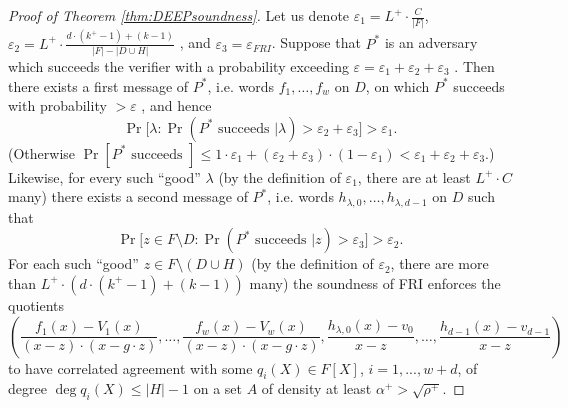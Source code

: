 \documentclass[11pt,article,oneside]{memoir}
\theoremstyle{definition}
\theoremstyle{remark}
\begin{document}
\begin{proof}[Proof of Theorem \ref{thm:DEEPsoundness}]
Let us denote $\varepsilon_1=L^+ \cdot \frac{C}{|F|}$, $\varepsilon_2 = L^+ \cdot  \frac{d\cdot (k^+ - 1) + (k - 1)}{|F| - |D\cup H|}$ , and $\varepsilon_3=\varepsilon_{FRI}$. 
Suppose that $P^*$ is an adversary which succeeds the verifier with a probability exceeding $\varepsilon =\varepsilon_1+\varepsilon_2+\varepsilon_3$ .
Then there exists a first message of $P^*$, i.e. words  $f_1, \ldots, f_w$  on $D$, on which $P^*$ succeeds with probability $> \varepsilon$ , and hence
\[
\Pr\big[\lambda : \Pr\left(P^*\text{ succeeds } |\lambda\right) > \varepsilon_2+\varepsilon_3 \big] > \varepsilon_1.
\]
(Otherwise $\Pr[P^*\text{ succeeds }] \leq 1\cdot \varepsilon_1+ (\varepsilon_2 + \varepsilon_3)\cdot (1-\varepsilon_1) < \varepsilon_1+ \varepsilon_2 + \varepsilon_3$.) 
Likewise, for every such “good” $\lambda$ (by the definition of $\varepsilon_1$, there are at least $L^+\cdot C$ many) there exists a second message of $P^*$, i.e. words $h_{\lambda, 0}, \ldots, h_{\lambda, d-1}$ on $D$ such that 
\[
\Pr\big[ z\in F\setminus D :  \Pr(P^*\text{ succeeds }| z) >\varepsilon_3 \big] > \varepsilon_2.
\]
For each such “good” $z\in F\setminus (D\cup H)$ (by the definition of $\varepsilon_2$, there are more than $L^+\cdot \left(d\cdot (k^+ - 1) + (k - 1)\right)$ many) the soundness of FRI enforces the quotients
\[ 
\left( 
\frac{f_1(x)-V_1(x)}{(x-z)\cdot (x-g\cdot z)}, \ldots, \frac{f_w(x)-V_w(x)}{(x-z)\cdot (x-g\cdot z)}, \frac{h_{\lambda,0}(x)- v_0}{x-z}, \ldots , \frac{h_{d - 1}(x) -v_{d-1}}{x-z}
\right)
\]
to have correlated agreement with some $q_i(X)\in F[X]$, $i=1,...,w +d$, of degree $\deg q_i(X) \leq |H|-1$ on a set $A$ of density at least 
$
\alpha^+ %
> \sqrt{\rho^+}.
$ 



\end{proof}
\end{document}
